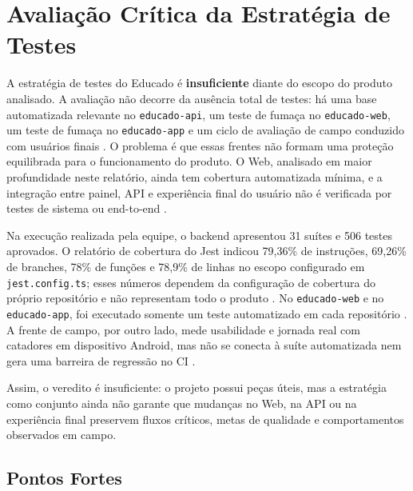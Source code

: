 
\section{Avaliação Crítica da Estratégia de Testes}

A estratégia de testes do Educado é \textbf{insuficiente} diante do escopo do
produto analisado. A avaliação não decorre da ausência total de testes: há uma
base automatizada relevante no \texttt{educado-api}, um teste de fumaça no
\texttt{educado-web}, um teste de fumaça no \texttt{educado-app} e um ciclo de
avaliação de campo conduzido com usuários finais \cite{educado-repos,psp5}. O
problema é que essas frentes não formam uma proteção equilibrada para o
funcionamento do produto. O Web, analisado em maior profundidade neste
relatório, ainda tem cobertura automatizada mínima, e a integração entre painel,
API e experiência final do usuário não é verificada por testes de sistema ou
end-to-end \cite{educado-repos}.

Na execução realizada pela equipe, o backend apresentou 31 suítes e 506 testes
aprovados. O relatório de cobertura do Jest indicou 79,36\% de instruções,
69,26\% de branches, 78\% de funções e 78,9\% de linhas no escopo configurado
em \texttt{jest.config.ts}; esses números dependem da configuração de cobertura
do próprio repositório e não representam todo o produto \cite{educado-repos}. No
\texttt{educado-web} e no \texttt{educado-app}, foi executado somente um teste
automatizado em cada repositório \cite{educado-repos}. A frente de campo, por
outro lado, mede usabilidade e jornada real com catadores em dispositivo Android,
mas não se conecta à suíte automatizada nem gera uma barreira de regressão no CI
\cite{psp5,dashboard}.

Assim, o veredito é insuficiente: o projeto possui peças úteis, mas a estratégia
como conjunto ainda não garante que mudanças no Web, na API ou na experiência
final preservem fluxos críticos, metas de qualidade e comportamentos observados
em campo.



\subsection{Pontos Fortes}

